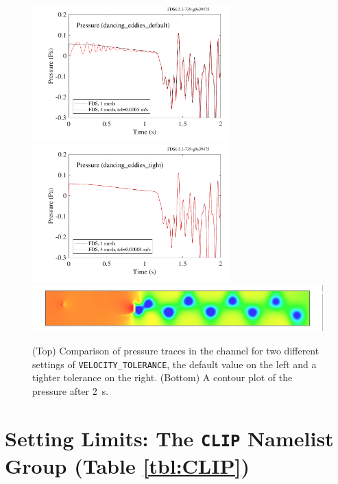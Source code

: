 \documentclass[11pt]{book}
\newcommand{\ct}{\tt\small}
\begin{document}
\begin{figure}[ht]
\begin{center}
\includegraphics[width=3in]{SCRIPT_FIGURES/dancing_eddies_default}
\includegraphics[width=3in]{SCRIPT_FIGURES/dancing_eddies_tight}
\includegraphics[width=\textwidth]{SCRIPT_FIGURES/dancing_eddies}
\end{center}
\caption[Results of the {\ct dancing\_eddies} test cases]{(Top) Comparison of pressure traces in the channel for two different settings
of {\ct VELOCITY\_TOLERANCE}, the default value on the left and a tighter tolerance on the right. (Bottom) A contour plot of the pressure after 2~s.}
\label{dancing_eddies}
\end{figure}



\clearpage

\section{Setting Limits: The \texorpdfstring{{\tt CLIP}}{CLIP} Namelist Group (Table \ref{tbl:CLIP})}
\label{info:CLIP}
\end{document}
